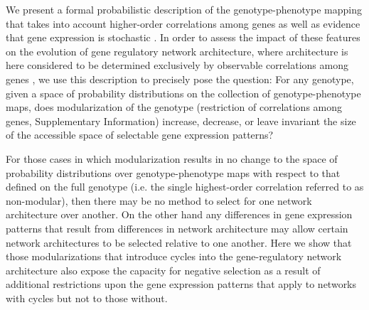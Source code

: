 
We present a formal probabilistic description of the genotype-phenotype mapping that takes into account higher-order correlations among genes as well as evidence that gene expression is stochastic \cite{Swain2002,Paulsson2004,Thattai2004,Acar2008a,Lestas2010,So2011,Munsky2012,Neuert2013,Sanchez2013}. In order to assess the impact of these features on the evolution of gene regulatory network architecture, where architecture is here considered to be determined exclusively by observable correlations among genes \cite{Friedman2008a}, we use this description to precisely pose the question: For any genotype, given a space of probability distributions on the collection of genotype-phenotype maps, does modularization of the genotype (restriction of correlations among genes, Supplementary Information) increase, decrease, or leave invariant the size of the accessible space of selectable gene expression patterns?

For those cases in which modularization results in no change to the space of probability distributions over genotype-phenotype maps with respect to that defined on the full genotype (i.e. the single highest-order correlation referred to as non-modular), then there may be no method to select for one network architecture over another. On the other hand any differences in gene expression patterns that result from differences in network architecture may allow certain network architectures to be selected relative to one another. Here we show that those modularizations that introduce cycles into the gene-regulatory network architecture also expose the capacity for negative selection as a result of additional restrictions upon the gene expression patterns that apply to networks with cycles but not to those without.


